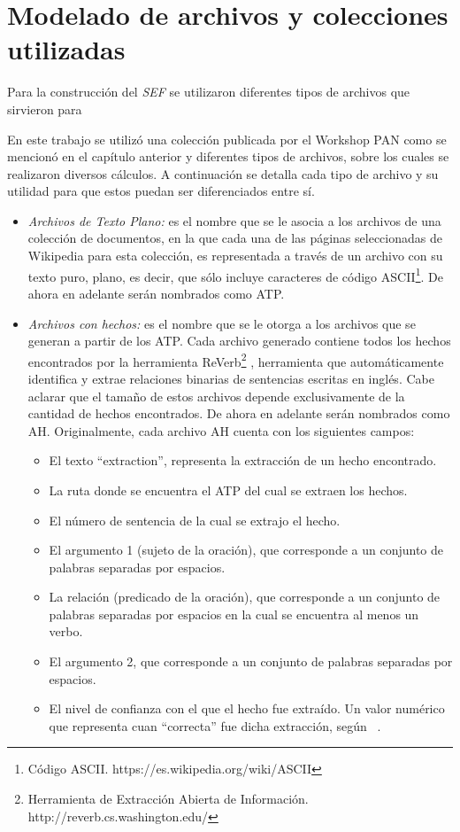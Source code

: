 \section{Modelado de archivos y colecciones utilizadas}

Para la construcci\'on del \emph{SEF} se utilizaron diferentes tipos de archivos que sirvieron para 
  
En este trabajo se utiliz\'o una colecci\'on publicada por el Workshop PAN como se mencion\'o en el cap\'itulo anterior y diferentes tipos de archivos, sobre los cuales se realizaron diversos c\'alculos. A continuaci\'on se detalla cada tipo de archivo y su utilidad para que estos puedan ser diferenciados entre s\'i.

\begin{itemize}

\item	\emph{Archivos de Texto Plano:} es el nombre que se le asocia a los archivos de una colecci\'on de documentos, en la que cada una de las p\'aginas seleccionadas de Wikipedia para esta colecci\'on, es representada a trav\'es de un archivo con su texto puro, plano, es decir, que s\'olo incluye caracteres de c\'odigo ASCII\footnote{C\'odigo ASCII. https://es.wikipedia.org/wiki/ASCII}. De ahora en adelante ser\'an nombrados como ATP.

\item	\emph{Archivos con hechos:} es el nombre que se le otorga a los archivos que se generan a partir de los ATP. Cada archivo generado contiene todos los hechos encontrados por la herramienta ReVerb\footnote{Herramienta de Extracci\'on Abierta de Informaci\'on. http://reverb.cs.washington.edu/} , herramienta que autom\'aticamente identifica y extrae relaciones binarias de sentencias escritas en ingl\'es. Cabe aclarar que el tama\~no de estos archivos depende exclusivamente de la cantidad de hechos encontrados. De ahora en adelante ser\'an nombrados como AH.
Originalmente, cada archivo AH cuenta con los siguientes campos:

\begin{itemize}
\item	El texto ``extraction'', representa la extracci\'on de un hecho encontrado.
\item	La ruta donde se encuentra el ATP del cual se extraen los hechos.
\item	El n\'umero de sentencia de la cual se extrajo el hecho.
\item	El argumento 1 (sujeto de la oraci\'on), que corresponde a un conjunto de palabras separadas por espacios.
\item	La relaci\'on (predicado de la oraci\'on), que corresponde a un conjunto de palabras separadas por espacios en la cual se encuentra al menos un verbo.
\item	El argumento 2, que corresponde a un conjunto de palabras separadas por espacios.
\item	El nivel de confianza con el que el hecho fue extra\'ido. Un valor num\'erico que representa cuan ``correcta'' fue dicha extracci\'on, seg\'un ~\cite{AnStOr:11}.
\end{itemize}


\end{itemize}
